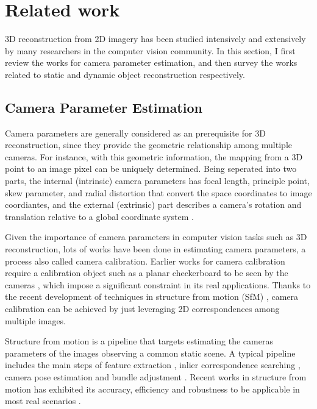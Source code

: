\chapter{Related work}

3D reconstruction from 2D imagery has been studied intensively and extensively by many researchers in the computer vision community. In this section, I first review the works for camera parameter estimation, and then survey the works related to static and dynamic object reconstruction respectively.

\section{Camera Parameter Estimation}
Camera parameters are generally considered as an prerequisite for 3D reconstruction, since they provide the geometric relationship among multiple cameras. For instance, with this geometric information, the mapping from a 3D point to an image pixel can be uniquely determined.
Being seperated into two parts, the internal (intrinsic) camera parameters has focal length, principle point, skew parameter, and radial distortion that convert the space coordinates to image coordiantes, and the external (extrinsic) part describes a camera's rotation and translation relative to a global coordinate system \cite{Hartley2004}. 

Given the importance of camera parameters in computer vision tasks such as 3D reconstruction, lots of works have been done in estimating camera parameters, a process also called camera calibration. Earlier works for camera calibration require a calibration object such as a planar checkerboard to be seen by the cameras \cite{conf/cvpr/SturmM99,zhang2000flexible,caltoolbox}, which impose a significant constraint in its real applications. Thanks to the recent development of techniques in structure from motion (SfM) \cite{Snavely2,snavely2008modeling,WuVSFM,wilson2013network,heinly2014_duplicate_structure,schoenberger2015paige,Heinly,heinly_dissertation,zheng2015_structureless_resection}, camera calibration can be achieved by just leveraging 2D correspondences among multiple images. 

Structure from motion is a pipeline that targets estimating the cameras parameters of the images observing a common static scene. A typical pipeline includes the main steps of feature extraction \cite{lowe2004_sift,rublee2011_orb,bay2008_surf}, inlier correspondence searching \cite{raguram2013usac}, camera pose estimation \cite{nister2003_five_point,kneip2011novel,zheng2014general,zheng2015_structureless_resection} and bundle adjustment \cite{agarwal2010_ba,wu2011_multicore_ba}. Recent works  in structure from motion has exhibited its accuracy, efficiency and robustness to be applicable in most real scenarios \cite{Snavely2,WuVSFM}.


